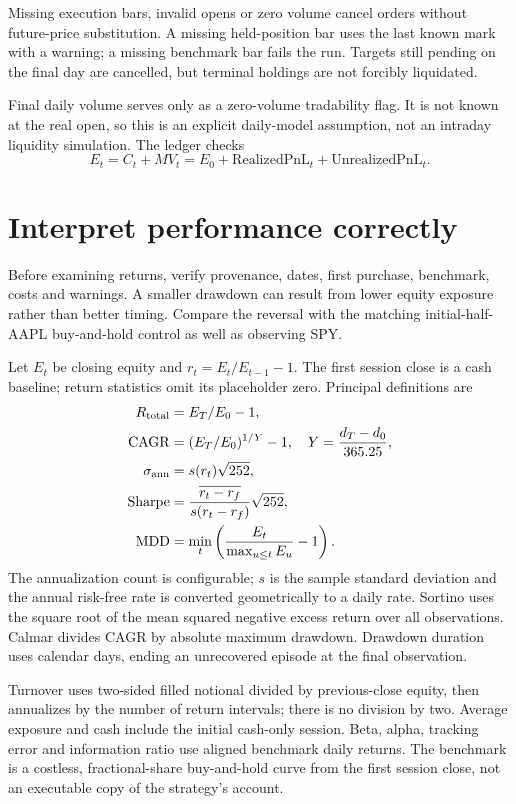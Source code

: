 \documentclass[11pt]{article}
\let\originalsection\section
\renewcommand{\section}{\Needspace{9\baselineskip}\originalsection}
\begin{document}
Missing execution bars, invalid opens or zero volume cancel orders without future-price substitution. A missing held-position bar uses the last known mark with a warning; a missing benchmark bar fails the run. Targets still pending on the final day are cancelled, but terminal holdings are not forcibly liquidated.

Final daily volume serves only as a zero-volume tradability flag. It is not known at the real open, so this is an explicit daily-model assumption, not an intraday liquidity simulation. The ledger checks
\[
E_t=C_t+MV_t=E_0+\mathrm{RealizedPnL}_t+\mathrm{UnrealizedPnL}_t.
\]

\section{Interpret performance correctly}
Before examining returns, verify provenance, dates, first purchase, benchmark, costs and warnings. A smaller drawdown can result from lower equity exposure rather than better timing. Compare the reversal with the matching initial-half-AAPL buy-and-hold control as well as observing SPY.

Let \(E_t\) be closing equity and \(r_t=E_t/E_{t-1}-1\). The first session close is a cash baseline; return statistics omit its placeholder zero. Principal definitions are
\begin{align*}
R_{\rm total}&=E_T/E_0-1,\\
\mathrm{CAGR}&=(E_T/E_0)^{1/Y}-1,\quad Y=\frac{d_T-d_0}{365.25},\\
\sigma_{\rm ann}&=s(r_t)\sqrt{252},\\
\mathrm{Sharpe}&=\frac{\overline{r_t-r_f}}{s(r_t-r_f)}\sqrt{252},\\
\mathrm{MDD}&=\min_t\left(\frac{E_t}{\max_{u\le t}E_u}-1\right).
\end{align*}
The annualization count is configurable; \(s\) is the sample standard deviation and the annual risk-free rate is converted geometrically to a daily rate. Sortino uses the square root of the mean squared negative excess return over all observations. Calmar divides CAGR by absolute maximum drawdown. Drawdown duration uses calendar days, ending an unrecovered episode at the final observation.

Turnover uses two-sided filled notional divided by previous-close equity, then annualizes by the number of return intervals; there is no division by two. Average exposure and cash include the initial cash-only session. Beta, alpha, tracking error and information ratio use aligned benchmark daily returns. The benchmark is a costless, fractional-share buy-and-hold curve from the first session close, not an executable copy of the strategy's account.
\end{document}
